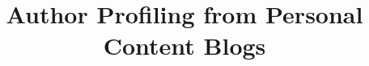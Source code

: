 \documentclass{sig-alternate}
\begin{document}
\title{Author Profiling from Personal Content Blogs}
%
%
%
%
%
\end{document}
